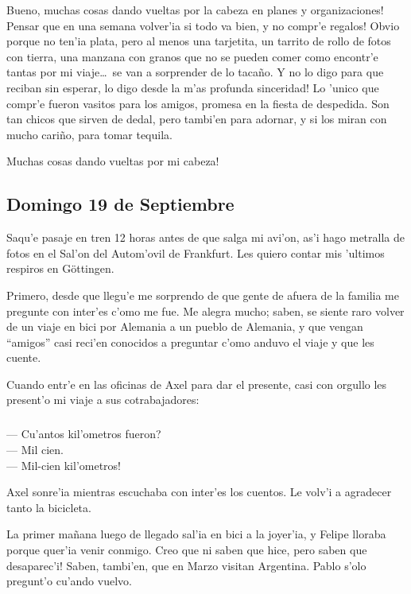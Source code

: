 Bueno, \textexclamdown muchas cosas dando vueltas por la cabeza en planes y
organizaciones! \textexclamdown Pensar que en una semana volver'ia si todo va
bien, y no compr'e regalos! Obvio porque no ten'ia plata, pero al menos una
tarjetita, un tarrito de rollo de fotos con tierra, una manzana con granos que
no se pueden comer como encontr'e tantas por mi viaje\ldots\ se van a sorprender
de lo taca\~no. Y no lo digo para que reciban sin esperar, \textexclamdown lo
digo desde la m'as profunda sinceridad! Lo 'unico que compr'e fueron vasitos
para los amigos, promesa en la fiesta de despedida. Son tan chicos que sirven de
dedal, pero tambi'en para adornar, y si los miran con mucho cari\~no, para tomar
tequila.

\textexclamdown Muchas cosas dando vueltas por mi cabeza!

\subsection*{Domingo 19 de Septiembre}

Saqu'e pasaje en tren 12 horas antes de que salga mi avi'on, as'i hago metralla
de fotos en el Sal'on del Autom'ovil de Frankfurt. Les quiero contar mis
'ultimos respiros en G\"ottingen.

Primero, desde que llegu'e me sorprendo de que gente de afuera de la familia me
pregunte con inter'es c'omo me fue. Me alegra mucho; saben, se siente raro
volver de un viaje en bici por Alemania a un pueblo de Alemania, y que vengan
``amigos'' casi reci'en conocidos a preguntar c'omo anduvo el viaje y que les
cuente.

Cuando entr'e en las oficinas de Axel para dar el presente, casi con orgullo les
present'o mi viaje a sus cotrabajadores:

\subparagraph{}\label{ssub:cuantoskm} --- \textquestiondown Cu'antos kil'ometros
fueron?\\ --- Mil cien.\\ --- \textexclamdown Mil-cien kil'ometros!\\
\hangindent=1cm

Axel sonre'ia mientras escuchaba con inter'es los cuentos. Le volv'i a agradecer
tanto la bicicleta.

La primer ma\~nana luego de llegado sal'ia en bici a la joyer'ia, y Felipe
lloraba porque quer'ia venir conmigo. \textexclamdown Creo que ni saben que
hice, pero saben que desaparec'i! Saben, tambi'en, que en Marzo visitan
Argentina. Pablo s'olo pregunt'o cu'ando vuelvo.

